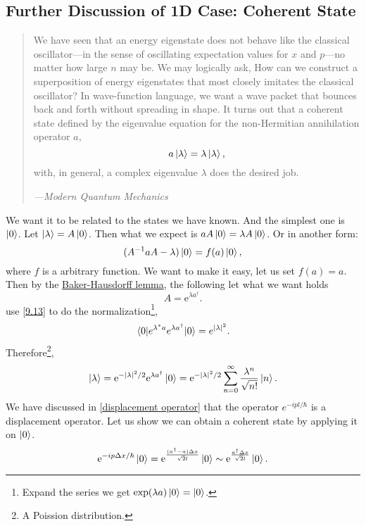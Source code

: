 \documentclass{article}
\theoremstyle{1}
\newcommand{\ee}{\mathrm{e}}
\begin{document}
\subsection{Further Discussion of 1D Case: Coherent State}
\begin{quotation}
    We have seen that an energy eigenstate does not behave like the classical
oscillator—in the sense of oscillating expectation values for $x$ and $p$—no matter
how large $n$ may be. We may logically ask, How can we construct a superposition
of energy eigenstates that most closely imitates the classical oscillator? In wave-function language, we want a wave packet that bounces back and forth without
spreading in shape. It turns out that a coherent state defined by the eigenvalue
equation for the non-Hermitian annihilation operator $a$,
$$a\ket{\lambda}=\lambda\ket{\lambda},$$
with, in general, a complex eigenvalue $\lambda$ does the desired job. 
\begin{flushright}
    {\raggedleft \textit{---Modern Quantum Mechanics}}
\end{flushright}
\end{quotation}
We want it to be related to the states we have known. And the simplest one is $\ket{0}$. Let $\ket{\lambda}=A\ket{0}$. Then what we expect is $aA\ket{0}=\lambda A\ket{0}$. Or in another form:
\begin{equation*}
    (A^{-1}aA-\lambda)\ket{0}=f(a)\ket{0},
\end{equation*}
where $f$ is a arbitrary function. We want to make it easy, let us set $f(a)=a$. Then by the \hyperref[Baker-Hausdorff lemma]{Baker-Hausdorff lemma}, the following let what we want holds
\begin{equation}
    A=\ee^{\lambda a^\dagger}.
\end{equation}
use \eqref{9.13} to do the normalization\footnote{Expand the series we get $\exp(\lambda a)\ket{0}=\ket{0}$.},
\begin{equation}
    \expval{e^{\lambda^* a}e^{\lambda a^\dagger}}{0}=e^{\left|\lambda\right|^2}.
\end{equation}
Therefore\footnote{A Poission distribution.},
\begin{equation}
    \ket{\lambda}=\ee^{-\left|\lambda\right|^2/2}\ee^{\lambda a^\dagger}\ket{0}=\ee^{-\left|\lambda\right|^2/2}\sum_{n=0}^{\infty}\frac{\lambda^n}{\sqrt{n!}}\ket{n}.
\end{equation}
We have discussed in \ref{displacement operator} that the operator $e^{-i  pl/\hbar}$ is a displacement operator. Let us show we can obtain a coherent state by applying it on $\ket{0}$.
\begin{equation}
    \ee^{-ip\Delta x/\hbar}\ket{0}=\ee^{\frac{(a^\dagger-a)\Delta x}{\sqrt{2}l}}\ket{0}\sim \ee^{\frac{a^\dagger \Delta x}{\sqrt{2}l}}\ket{0}.
\end{equation}
\end{document}
